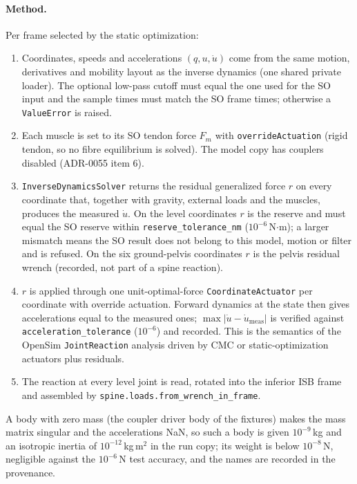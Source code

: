 \paragraph{Method.}
Per frame selected by the static optimization:
\begin{enumerate}
  \item Coordinates, speeds and accelerations $(q,u,\dot u)$ come from the same
        motion, derivatives and mobility layout as the inverse dynamics
        (one shared private loader). The optional low-pass cutoff must equal
        the one used for the SO input and the sample times must match the SO
        frame times; otherwise a \texttt{ValueError} is raised.
  \item Each muscle is set to its SO tendon force $F_m$ with
        \texttt{overrideActuation} (rigid tendon, so no fibre equilibrium is
        solved). The model copy has couplers disabled (ADR-0055 item 6).
  \item \texttt{InverseDynamicsSolver} returns the residual generalized force
        $r$ on every coordinate that, together with gravity, external loads
        and the muscles, produces the measured $\dot u$. On the level
        coordinates $r$ is the reserve and must equal the SO reserve within
        \texttt{reserve\_tolerance\_nm} ($10^{-6}$\,N$\cdot$m); a larger
        mismatch means the SO result does not belong to this model, motion or
        filter and is refused. On the six ground-pelvis coordinates $r$ is the
        pelvis residual wrench (recorded, not part of a spine reaction).
  \item $r$ is applied through one unit-optimal-force
        \texttt{CoordinateActuator} per coordinate with override actuation.
        Forward dynamics at the state then gives accelerations equal to the
        measured ones; $\max|\dot u-\dot u_{\mathrm{meas}}|$ is verified
        against \texttt{acceleration\_tolerance} ($10^{-6}$) and recorded. This
        is the semantics of the OpenSim \texttt{JointReaction} analysis driven
        by CMC or static-optimization actuators plus residuals.
  \item The reaction at every level joint is read, rotated into the inferior
        ISB frame and assembled by \texttt{spine.loads.from\_wrench\_in\_frame}.
\end{enumerate}
A body with zero mass (the coupler driver body of the fixtures) makes the mass
matrix singular and the accelerations NaN, so such a body is given
$10^{-9}$\,kg and an isotropic inertia of $10^{-12}$\,kg\,m$^2$ in the run
copy; its weight is below $10^{-8}$\,N, negligible against the $10^{-6}$\,N
test accuracy, and the names are recorded in the provenance.

